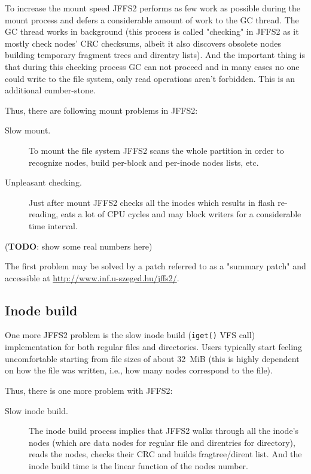 \documentclass[12pt,a4paper,oneside,titlepage]{article}
\newcommand{\TODO}[1]{({\textbf{TODO}: #1})\marginpar{\large \textbf{!?!}}}
\begin{document}
To increase the mount speed JFFS2 performs as few work as possible during
the mount process and defers
a considerable amount of work to the GC thread. The GC thread
works in background (this process is called "checking" in JFFS2 as it
mostly check nodes' CRC checksums, albeit it also discovers obsolete
nodes building temporary fragment trees and direntry lists). And the
important thing is that during this checking process GC can not proceed and in
many cases no one could write to
the file system, only read operations aren't forbidden. This is an
additional \mbox{cumber-stone}.

Thus, there are following mount problems in JFFS2:
\begin{description}
\item[Slow mount.] To mount the file system JFFS2 scans the whole partition in
order to recognize nodes, build \mbox{per-block} and \mbox{per-inode} nodes lists, etc.
\item[Unpleasant checking.] Just after mount JFFS2 checks all the
inodes which results in flash \mbox{re-reading}, eats a lot of CPU cycles and may block
writers for a considerable time interval. 
\end{description}

\TODO{show some real numbers here}

The first problem may be solved by a patch referred to as a "summary patch" and
accessible at \url{http://www.inf.u-szeged.hu/jffs2/}.

%
%
\subsection{Inode build}
One more JFFS2 problem is the slow inode build (\texttt{iget()} VFS call)
implementation for both regular files and directories. Users typically start
feeling uncomfortable starting from file sizes of about 32~MiB (this is highly
dependent on how the file was written, i.e., how many nodes correspond to the
file).

Thus, there is one more problem with JFFS2:
\begin{description}
\item[Slow inode build.] The inode build process implies that JFFS2 walks
through all the inode's nodes
(which are data nodes for regular file and direntries for directory),
reads the nodes, checks their CRC and builds fragtree/dirent list. And the inode
build time is the linear function of the nodes number.
\end{description}
\end{document}
